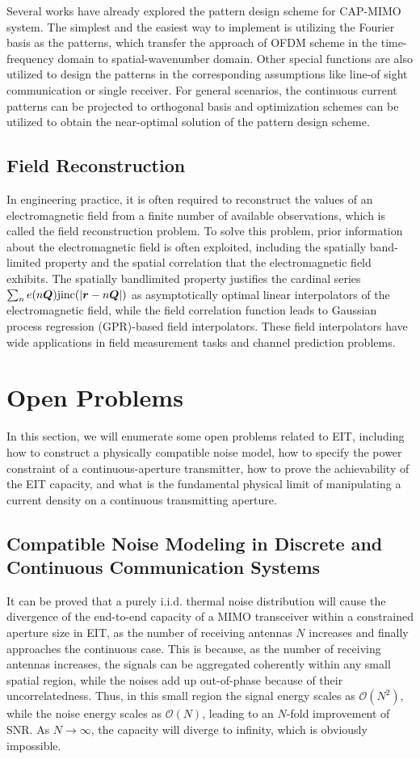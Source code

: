 \documentclass[journal,twocolumn]{IEEEtran}
\begin{document}
Several works have already explored the pattern design scheme for CAP-MIMO system. The simplest and the easiest way to implement is utilizing the Fourier basis as the patterns, which transfer the approach of OFDM scheme in the time-frequency domain to spatial-wavenumber domain. Other special functions are also utilized to design the patterns in the corresponding assumptions like line-of sight communication or single receiver. For general scenarios, the continuous current patterns can be projected to orthogonal basis and optimization schemes can be utilized to obtain the near-optimal solution of the pattern design scheme.

\subsection{Field Reconstruction}
In engineering practice, it is often required to reconstruct the values of an electromagnetic field from a finite number of available observations, which is called the field reconstruction problem. 
To solve this problem, prior information about the electromagnetic field is often exploited, including the spatially band-limited property and the spatial correlation that the electromagnetic field exhibits. 
The spatially bandlimited property justifies the cardinal series $\sum_n e(n{\bm Q}) {\rm jinc}(|{\bm r}-n{\bm Q}|)$ as asymptotically optimal linear interpolators \cite{pizzo2022nyquist} of the electromagnetic field, while the field correlation function leads to Gaussian process regression (GPR)-based field interpolators. 
These field interpolators have wide applications in field measurement tasks and channel prediction problems. 

\section{Open Problems}
In this section, we will enumerate some open problems related to EIT, including how to construct a physically compatible noise model, how to specify the power constraint of a continuous-aperture transmitter, how to prove the achievability of the EIT capacity, and what is the fundamental physical limit of manipulating a current density on a continuous transmitting aperture. 

\subsection{Compatible Noise Modeling in Discrete and Continuous Communication Systems}
It can be proved that a purely i.i.d. thermal noise distribution will cause the divergence of the end-to-end capacity of a MIMO transceiver within a constrained aperture size in EIT, as the number of receiving antennas $N$ increases and finally approaches the continuous case. 
This is because, as the number of receiving antennas increases, the signals can be aggregated coherently within any small spatial region, while the noises add up out-of-phase because of their uncorrelatedness. 
Thus, in this small region the signal energy scales as $\mathcal{O}(N^2)$, while the noise energy scales as $\mathcal{O}(N)$, leading to an $N$-fold improvement of SNR. As $N\to\infty$, the capacity will diverge to infinity, which is obviously impossible.  
\end{document}
